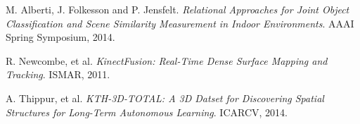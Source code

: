 \documentclass[12pt]{article}
\begin{document}
%
%


\newpage

\begin{thebibliography}{9}

M. Alberti, J. Folkesson and P. Jensfelt. 
\textit{Relational Approaches for Joint Object Classification and Scene Similarity Measurement in Indoor Environments}. 
AAAI Spring Symposium, 2014.
 
R. Newcombe, et al. 
\textit{KinectFusion: Real-Time Dense Surface Mapping and Tracking}. 
ISMAR, 2011.

A. Thippur, et al. 
\textit{KTH-3D-TOTAL: A 3D Datset for Discovering Spatial Structures for Long-Term Autonomous Learning}. 
ICARCV, 2014.
 
\end{thebibliography}
\end{document}
